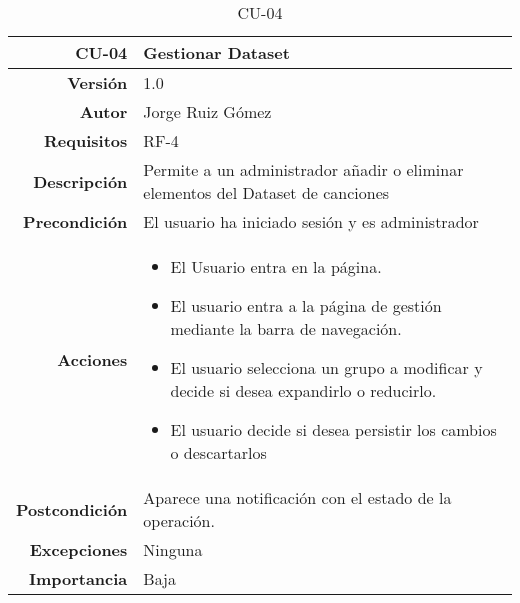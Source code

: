 \begin{table}[]
\centering
\begin{tabular}{r|p{}}
\hline
\textbf{CU-04}         & \textbf{Gestionar Dataset}                                 \\ \hline
\textbf{Versión}       & 1.0                                                     \\
\textbf{Autor}         & Jorge Ruiz Gómez                                        \\
\textbf{Requisitos}    & RF-4                                         \\
\textbf{Descripción}   & Permite a un administrador añadir o eliminar elementos del Dataset de canciones \\ \hline
\textbf{Precondición}  & El usuario ha iniciado sesión y es administrador                                                \\
\textbf{Acciones}      &    \begin{itemize}
                                \item El Usuario entra en la página.
                                \item El usuario entra a la página de gestión mediante la barra de navegación.
                                \item El usuario selecciona un grupo a modificar y decide si desea expandirlo o reducirlo.
                                \item El usuario decide si desea persistir los cambios o descartarlos
                            \end{itemize}\\
                                                                          
\textbf{Postcondición} & Aparece una notificación con el estado de la operación.\\
\textbf{Excepciones}   & Ninguna                                                 \\
\textbf{Importancia}   & Baja                                                    \\ \hline
\end{tabular}
\caption{CU-04}
\label{tab:my-table}
\end{table}








